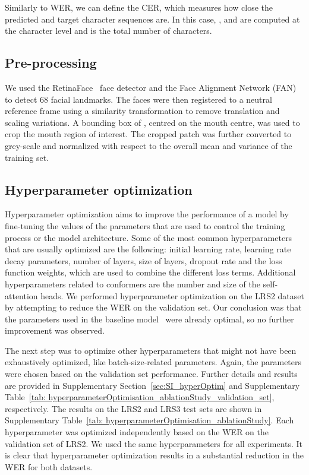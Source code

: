 \documentclass[twocolumn]{article}
\begin{document}
Similarly to WER, we can define the CER, which measures how close the predicted and target character sequences are. In this case, ,  and  are computed at the character level and  is the total number of characters.

\subsection{Pre-processing}
We used the RetinaFace~\cite{DBLP:journals/corr/abs-1905-00641} face detector and the Face Alignment Network (FAN)~\cite{bulat2017far} to detect 68 facial landmarks. The faces were then registered to a neutral reference frame using a similarity transformation to remove translation and scaling variations. A bounding box of , centred on the mouth centre, was used to crop the mouth region of interest. The cropped patch was further converted to grey-scale and normalized with respect to the overall mean and variance of the training set.

\subsection{Hyperparameter optimization}
Hyperparameter optimization aims to improve the performance of a model by fine-tuning the values of the parameters that are used to control the training process or the model architecture. Some of the most common hyperparameters that are usually optimized are the following: initial learning rate, learning rate decay parameters, number of layers, size of layers, dropout rate and the loss function weights, which are used to combine the different loss terms. Additional hyperparameters related to conformers are the number and size of the self-attention heads. We performed hyperparameter optimization on the LRS2 dataset by attempting to reduce the WER on the validation set. Our conclusion was that the parameters used in the baseline model~\cite{DBLP:journals/corr/abs-2102-06657} were already optimal, so no further improvement was observed.

The next step was to optimize other hyperparameters that might not have been exhaustively optimized, like batch-size-related parameters. Again, the parameters were chosen based on the validation set performance. Further details and results are provided in Supplementary Section~\ref{sec:SI_hyperOptim} and Supplementary Table~\ref{tab: hyperparameterOptimisation_ablationStudy_validation_set}, respectively. The results on the LRS2 and LRS3 test sets are shown in Supplementary Table~\ref{tab: hyperparameterOptimisation_ablationStudy}. Each hyperparameter was optimized independently based on the WER on the validation set of LRS2. We used the same hyperparameters for all experiments. It is clear that hyperparameter optimization results in a substantial reduction in the WER for both datasets.
\end{document}
